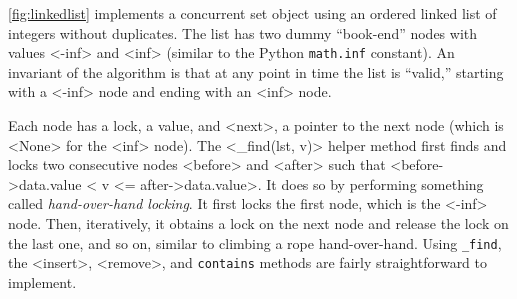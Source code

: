 \documentclass{report}
\begin{document}
\autoref{fig:linkedlist} implements a concurrent set object using
an ordered linked list of integers without duplicates.
The list has two dummy ``book-end'' nodes with values <{-inf}> and
<{inf}> (similar to the Python \texttt{math.inf} constant).
An invariant of the algorithm is that at any point in time the
list is ``valid,'' starting with a <{-inf}> node and ending
with an <{inf}> node.

%
Each node has a lock, a value, and <{next}>, a pointer to the next node
(which is <{None}> for the <{inf}> node).
The <{_find(lst, v)}> helper method first
finds and locks two consecutive nodes <{before}> and <{after}>
such that <{before->data.value < v <= after->data.value}>.
It does so by performing something called \emph{hand-over-hand locking}.
It first locks the first node, which is the <{-inf}> node.
Then, iteratively, it obtains a lock on the next node and release the
lock on the last one, and so on, similar to climbing a rope
hand-over-hand.
Using \texttt{\_find}, the <{insert}>, <{remove}>, and \texttt{contains}
methods are fairly straightforward to implement.

\end{document}
